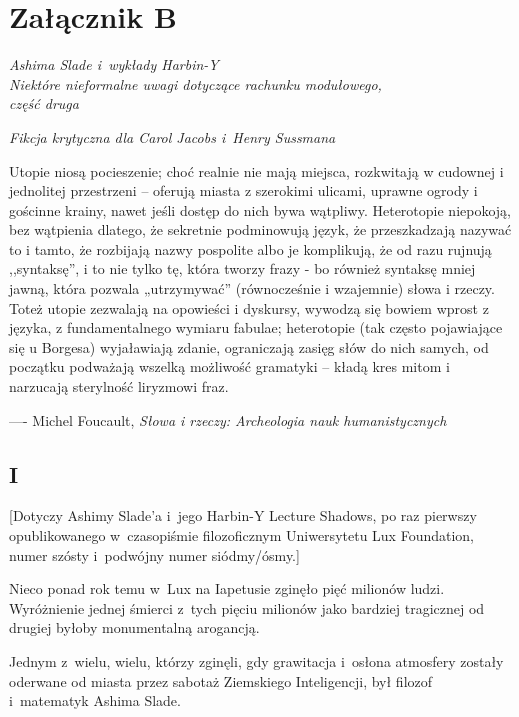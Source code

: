 \documentclass[oneside,polish,11pt,rmheadings]{mwbk}
\begin{document}
\chapter*{Załącznik B}


\begin{center}
\textit{Ashima Slade i~wykłady Harbin-Y \\ Niektóre nieformalne uwagi dotyczące rachunku modułowego, \\ część druga}

\textit{Fikcja krytyczna dla Carol Jacobs i~Henry Sussmana}

\end{center}


Utopie niosą pocieszenie; choć realnie nie mają miejsca, roz­kwitają w cudownej i jednolitej przestrzeni -- oferują miasta z szerokimi ulicami, uprawne ogrody i gościnne krainy, nawet jeśli dostęp do nich bywa wątpliwy. Heterotopie niepokoją, bez wątpienia dlatego, że sekretnie podminowują język, że przeszkadzają nazywać to i tamto, że rozbijają nazwy pospolite albo je komplikują, że od razu rujnują ,,syntaksę'', i to nie tylko tę, która tworzy frazy - bo również syntaksę mniej jawną, która pozwala „utrzymywać” (równocześnie i wzajemnie) słowa i rzeczy. Toteż utopie zezwalają na opowieści i dyskursy, wywodzą się bowiem wprost z języka, z fundamental­nego wymiaru fabulae; heterotopie (tak często pojawiające się u Borgesa) wyjaławiają zdanie, ograniczają zasięg słów do nich samych, od początku podważają wszelką możliwość gramatyki -- kładą kres mitom i narzucają sterylność liryzmowi fraz.

\medskip
---- Michel Foucault, \textit{Słowa i rzeczy: Archeologia nauk humanistycznych}

\section*{I}

[Dotyczy Ashimy Slade'a i~jego Harbin-Y Lecture Shadows, po raz pierwszy opublikowanego w~czasopiśmie filozoficznym Uniwersytetu Lux Foundation, numer szósty i~podwójny numer siódmy/ósmy.] 

Nieco ponad rok temu w~Lux na Iapetusie zginęło pięć milionów ludzi. Wyróżnienie jednej śmierci z~tych pięciu milionów jako bardziej tragicznej od drugiej byłoby monumentalną arogancją.

Jednym z~wielu, wielu, którzy zginęli, gdy grawitacja i~osłona atmosfery zostały oderwane od miasta przez sabotaż Ziemskiego Inteligencji, był filozof i~matematyk Ashima Slade. 
\end{document}
